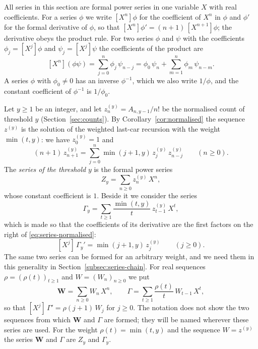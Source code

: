 \documentclass{amsart}
\makeatletter
\theoremstyle{definition}
\theoremstyle{remark}
\numberwithin{equation}{section}
\def\subsection{\@startsection{subsection}{2}\z@{.5\linespacing\@plus.7\linespacing}{-.5em}{\normalfont\bfseries\boldmath}}
\makeatother
\begin{document}
\subsection{The series of a threshold}\label{subsec:series-threshold}

All series in this section are formal power series in one variable $X$ with
real coefficients. For a series $\phi$
we write $[X^n]\phi$ for the coefficient of $X^n$ in $\phi$ and $\phi'$ for
the formal derivative of $\phi$, so that
$[X^n]\phi'=(n+1)\,[X^{n+1}]\phi$; the derivative obeys the product rule. For
two series $\phi$ and $\psi$ with the coefficients $\phi_j=[X^j]\phi$ and
$\psi_j=[X^j]\psi$ the coefficients of the product are
\begin{equation}\label{eq:series-product}
[X^n](\phi\psi)=\sum_{j=0}^{n}\phi_j\,\psi_{n-j}
=\phi_0\,\psi_n+\sum_{m=1}^{n}\phi_m\,\psi_{n-m}.
\end{equation}
A series $\phi$ with $\phi_0\ne0$ has an inverse
$\phi^{-1}$, which we also write $1/\phi$, and the constant coefficient of
$\phi^{-1}$ is $1/\phi_0$.

Let $y\ge1$ be an integer, and let $z^{(y)}_n=A_{n,y-1}/n!$ be the normalised
count of threshold $y$ (Section~\ref{sec:counts}). By
Corollary~\ref{cor:normalised} the sequence $z^{(y)}$ is the solution of the
weighted last-car recursion with the weight $\min(t,y)$: we have
$z^{(y)}_0=1$ and
\begin{equation}\label{eq:series-normalised}
(n+1)\,z^{(y)}_{n+1}=\sum_{j=0}^{n}\min(j+1,y)\,z^{(y)}_j\,z^{(y)}_{n-j}
\qquad(n\ge0).
\end{equation}
The \emph{series of the threshold} $y$ is the formal power series
\[
Z_y=\sum_{n\ge0}z^{(y)}_n\,X^n ,
\]
whose constant coefficient is $1$. Beside it we consider the series
\[
\Gamma_y=\sum_{t\ge1}\frac{\min(t,y)}{t}\,z^{(y)}_{t-1}\,X^t ,
\]
which is made so that the coefficients of its derivative are the first factors
on the right of \eqref{eq:series-normalised}:
\begin{equation}\label{eq:series-log-coefficients}
[X^j]\,\Gamma_y'=\min(j+1,y)\,z^{(y)}_j\qquad(j\ge0).
\end{equation}
The same two series can be formed for an arbitrary weight, and we need them in
this generality in Section~\ref{subsec:series-chain}. For real sequences
$\rho=(\rho(t))_{t\ge1}$ and $W=(W_n)_{n\ge0}$ we put
\[
\mathbf W=\sum_{n\ge0}W_n\,X^n,\qquad
\Gamma=\sum_{t\ge1}\frac{\rho(t)}{t}\,W_{t-1}\,X^t ,
\]
so that $[X^j]\,\Gamma'=\rho(j+1)\,W_j$ for $j\ge0$. The notation does not
show the two sequences from which $\mathbf W$ and $\Gamma$ are formed; they
will be named wherever these series are used. For the weight
$\rho(t)=\min(t,y)$ and the sequence $W=z^{(y)}$ the series $\mathbf W$ and
$\Gamma$ are $Z_y$ and $\Gamma_y$.
\end{document}
